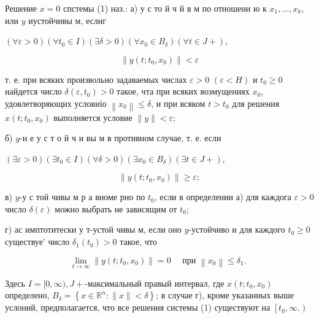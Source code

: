 \documentclass[10pt]{article}
\begin{document}
Решение $x=0$ спстемы (1) наз.: а) у с то й ч й в м по отношени ю к $x_{1}, \ldots, x_{k}$, или $y$ иустойчивы м, еслиг



$(\forall \varepsilon>0)\left(\forall t_{0} \in I\right)(\exists \delta>0)\left(\forall x_{0} \in B_{\delta}\right)(\forall t \in J+)$,



\[

\left\|y\left(t ; t_{0}, x_{0}\right)\right\|<\varepsilon

\]



т. е. при всяких произвольно задаваемых числах $\varepsilon>0$ $(\varepsilon<H)$ и $t_{0} \geqslant 0$ найдется число $\delta\left(\varepsilon, t_{0}\right)>0$ такое, чта при всяких возмущениях $x_{0}$, удовлетворяющих условиіо $\left\|x_{0}\right\| \leqslant \delta$, и при всяком $t>t_{0}$ для решения $x\left(t ; t_{0}, x_{0}\right)$ выполняется условие $\|y\|<\varepsilon$;



б) $y$-н е у с т о й ч и вы м в противном случае, т. е. если



$(\exists \varepsilon>0)\left(\exists t_{0} \in I\right)(\forall \delta>0)\left(\exists x_{0} \in B_{\delta}\right)(\exists t \in J+)$,



\[

\left\|y\left(t ; t_{0}, x_{0}\right)\right\| \geqslant \varepsilon ;

\]



в) $y$-у с той чивы м р а вноме рно по $t_{0}$, если в определении а) для каждога $\varepsilon>0$ число $\delta(\varepsilon)$ можно выбрать не зависящим от $t_{0}$;



г) ас имптотитески $у$ т-устой чивы м, если оно $y$-устойчиво и для каждого $t_{0} \geqslant 0$ существуе' число $\delta_{1}\left(t_{0}\right)>0$ такое, что



\[

\lim _{t \rightarrow \infty}\left\|y\left(t ; t_{0}, x_{0}\right)\right\|=0 \quad \text { при }\left\|x_{0}\right\| \leqslant \delta_{1} \text {. }

\]



Здесь $I=[0, \infty), J+$-максимальный правый интервал, где $x\left(t ; t_{0}, x_{0}\right)$ определено, $B_{\delta}=\left\{x \in \mathbb{R}^{n}:\|x\|<\delta\right\}$; в случае г), кроме указанных выше услоний, предполагается, что все решения системы (1) существуют на $\left[t_{0}, \infty.\right)$
\end{document}
